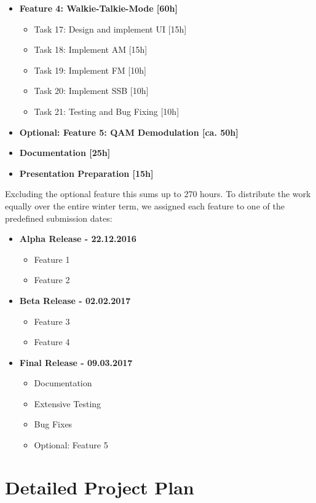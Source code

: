 \begin{itemize}
\begin{itemize}
\end{itemize}
\item \textbf{Feature 4: Walkie-Talkie-Mode [60h]}
\begin{itemize}
\item Task 17: Design and implement UI [15h]
\item Task 18: Implement AM [15h]
\item Task 19: Implement FM [10h]
\item Task 20: Implement SSB [10h]
\item Task 21: Testing and Bug Fixing [10h]
\end{itemize}
\item \textbf{Optional: Feature 5: \ac{QAM} Demodulation [ca. 50h]}
\item \textbf{Documentation [25h]}
\item \textbf{Presentation Preparation [15h]}

\end{itemize}

Excluding the optional feature this sums up to 270 hours. To distribute the work equally over the entire winter term, we assigned each feature to one of the predefined submission dates:

\begin{itemize}
	\item \textbf{Alpha Release - 22.12.2016}
		\begin{itemize}
		\item Feature 1
		\item Feature 2
		\end{itemize}
	\item \textbf{Beta Release - 02.02.2017}
		\begin{itemize}
			\item Feature 3
			\item Feature 4
		\end{itemize}
	\item \textbf{Final Release - 09.03.2017}
		\begin{itemize}
			\item Documentation
			\item Extensive Testing
			\item Bug Fixes
			\item Optional: Feature 5
		\end{itemize}
		
\end{itemize}

\section{Detailed Project Plan}

